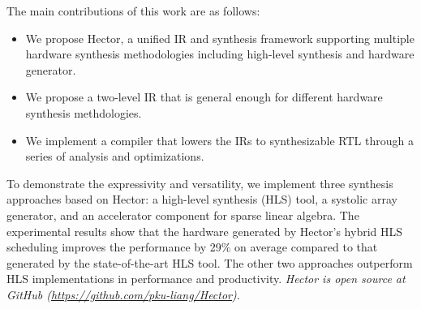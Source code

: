 The main contributions of this work are as follows:
\begin{itemize}
\item We propose Hector, a unified IR and synthesis framework supporting multiple hardware synthesis methodologies including high-level synthesis and hardware generator. 
\item We propose a two-level IR that is general enough for different hardware synthesis methdologies. 
\item We implement a compiler that lowers the IRs to synthesizable RTL through a series of analysis  and optimizations.


\end{itemize}

To demonstrate the expressivity and versatility, we implement three synthesis approaches based on Hector: a high-level synthesis (HLS) tool, a systolic array generator, and an accelerator component for sparse linear algebra. The experimental results show that the hardware generated by Hector's hybrid HLS scheduling improves the performance by 29$\%$ on average compared to that generated by the state-of-the-art HLS tool. The other two approaches outperform HLS
implementations in performance and productivity. \textit{Hector is open source at GitHub (\url{https://github.com/pku-liang/Hector})}. 
